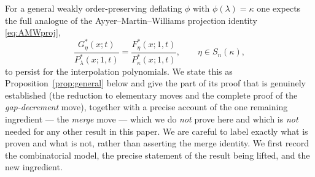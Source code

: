 \begin{qthreeremark}\label{rmk:general}
For a general weakly order-preserving deflating $\phi$ with $\phi(\lambda)=\kappa$
one expects the full analogue of the Ayyer--Martin--Williams projection identity
\eqref{eq:AMWproj},
\[
\frac{G^*_\eta(x;t)}{P^*_\lambda(x;1,t)}=\frac{F^*_\eta(x;1,t)}{P^*_\kappa(x;1,t)},
\qquad \eta\in S_n(\kappa),
\]
to persist for the interpolation polynomials. We state this as
Proposition~\ref{prop:general} below and give the part of its proof that is
genuinely established (the reduction to elementary moves and the complete proof of
the \emph{gap-decrement} move), together with a precise account of the one
remaining ingredient --- the \emph{merge} move --- which we do \emph{not} prove
here and which is \emph{not} needed for any other result in this paper. We are
careful to label exactly what is proven and what is not, rather than asserting the
merge identity. We first record the combinatorial model, the precise statement of
the result being lifted, and the new ingredient.
\end{qthreeremark}

